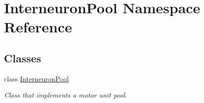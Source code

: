 \hypertarget{namespace_interneuron_pool}{}\section{Interneuron\+Pool Namespace Reference}
\label{namespace_interneuron_pool}
\subsection*{Classes}
\begin{DoxyCompactItemize}
\item 
class \hyperlink{class_interneuron_pool_1_1_interneuron_pool}{Interneuron\+Pool}
\begin{DoxyCompactList}\small\item\em Class that implements a motor unit pool. \end{DoxyCompactList}\end{DoxyCompactItemize}
